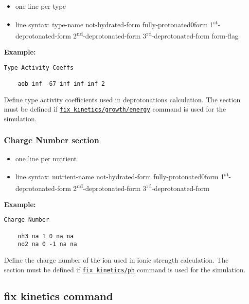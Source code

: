 \documentclass[11pt,a4paper,openright]{article}
\begin{document}
\begin{itemize} [nosep]
    \item one line per type
    \item line syntax: type-name {} not-hydrated-form {} fully-protonated0form {} 1\textsuperscript{st}-deprotonated-form {} 2\textsuperscript{nd}-deprotonated-form {} 3\textsuperscript{rd}-deprotonated-form {} form-flag \\
    
\end{itemize} 

\textbf{Example:}
\begin{Verbatim}[frame=single]
 Type Activity Coeffs

    aob inf -67 inf inf inf 2

\end{Verbatim}

Define type activity coefficients used in deprotonations calculation.
The section must be defined if 
\hyperref[fkineticsenergy]{\tt fix kinetics/growth/energy}
command is used for the simulation. 

\newpage
\subsubsection{Charge Number section}
\label{scharge}
\begin{itemize} [nosep]
    \item one line per nutrient
    \item line syntax: nutrient-name {} not-hydrated-form {} fully-protonated0form {} 1\textsuperscript{st}-deprotonated-form {} 2\textsuperscript{nd}-deprotonated-form {} 3\textsuperscript{rd}-deprotonated-form \\
    
\end{itemize} 

\textbf{Example:}
\begin{Verbatim}[frame=single]
 Charge Number

    nh3 na 1 0 na na
    no2 na 0 -1 na na

\end{Verbatim}

Define the charge number of the ion used in ionic strength calculation.
The section must be defined if 
\hyperref[fkineticsenergy]{\tt fix kinetics/ph}
command is used for the simulation. 


\newpage

\subsection{fix kinetics command}
\label{fkinetics}
\end{document}
